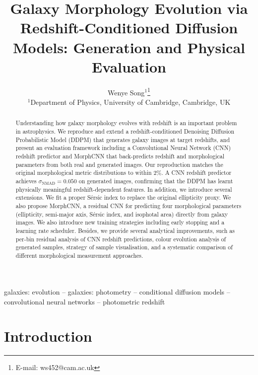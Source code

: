 \documentclass[fleqn,usenatbib]{mnras}
\title[Galaxy Morphology via Diffusion Models]{Galaxy Morphology Evolution via Redshift-Conditioned Diffusion Models: Generation and Physical Evaluation}
\author[W. Song]{
Wenye Song$^{1}$\thanks{E-mail: ws452@cam.ac.uk}
\\
$^{1}$Department of Physics, University of Cambridge, Cambridge, UK
}
\date{}
\begin{document}
\label{firstpage}
\pagerange{\pageref{firstpage}--\pageref{lastpage}}
\maketitle

\begin{abstract}
Understanding how galaxy morphology evolves with redshift is an important
problem in astrophysics.
We reproduce and extend a redshift-conditioned Denoising Diffusion
Probabilistic Model (DDPM) that generates galaxy images at target
redshifts, and present an evaluation framework including a Convolutional Neural Network (CNN) redshift predictor and MorphCNN that
back-predicts redshift and morphological parameters from both real and
generated images.
Our reproduction matches the original morphological metric distributions
to within 2\%.
A CNN redshift predictor achieves $\sigma_\mathrm{NMAD} = 0.050$ on
generated images, confirming that the DDPM has learnt physically
meaningful redshift-dependent features.
In addition, we introduce several extensions.
We fit a proper S\'{e}rsic index to replace the original ellipticity
proxy.
We also propose MorphCNN, a residual CNN for predicting four
morphological parameters (ellipticity, semi-major axis, S\'{e}rsic
index, and isophotal area) directly from galaxy images.
We also introduce new training strategies including early stopping and
a learning rate scheduler.
Besides, we provide several analytical improvements, such as per-bin
residual analysis of CNN redshift predictions, colour evolution
analysis of generated samples, strategy of sample visualisation, and a systematic comparison of
different morphological measurement approaches.

\end{abstract}

\begin{keywords}
galaxies: evolution -- galaxies: photometry -- conditional diffusion models -- convolutional neural networks -- photometric redshift
\end{keywords}



\section{Introduction}
\end{document}
